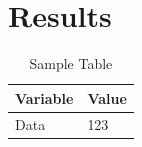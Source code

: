 \section{Results}
\begin{table}[ht] 
    \centering
    \begin{tabular}{ll}
        \toprule
        Variable & Value \\
        \midrule
        Data & 123 \\
        \bottomrule
    \end{tabular}
    \caption{Sample Table}
\end{table}